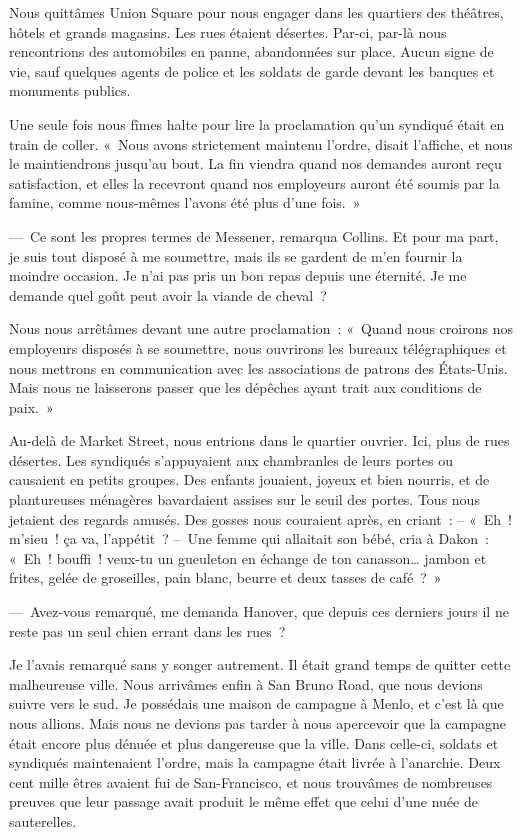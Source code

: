 \documentclass[french,twoside]{book} %
\begin{document}
Nous quittâmes Union Square pour nous engager dans les quartiers des théâtres, hôtels et grands magasins. Les rues étaient désertes. Par-ci, par-là nous rencontrions des automobiles en panne, abandonnées sur place. Aucun signe de vie, sauf quelques agents de police et les soldats de garde devant les banques et monuments publics.\par
Une seule fois nous fîmes halte pour lire la proclamation qu’un syndiqué était en train de coller. « Nous avons strictement maintenu l’ordre, disait l’affiche, et nous le maintiendrons jusqu’au bout. La fin viendra quand nos demandes auront reçu satisfaction, et elles la recevront quand nos employeurs auront été soumis par la famine, comme nous-mêmes l’avons été plus d’une fois. »\par
— Ce sont les propres termes de Messener, remarqua Collins. Et pour ma part, je suis tout disposé à me soumettre, mais ils se gardent de m’en fournir la moindre occasion. Je n’ai pas pris un bon repas depuis une éternité. Je me demande quel goût peut avoir la viande de cheval ?\par
Nous nous arrêtâmes devant une autre proclamation : « Quand nous croirons nos employeurs disposés à se soumettre, nous ouvrirons les bureaux télégraphiques et nous mettrons en communication avec les associations de patrons des États-Unis. Mais nous ne laisserons passer que les dépêches ayant trait aux conditions de paix. »\par
Au-delà de Market Street, nous entrions dans le quartier ouvrier. Ici, plus de rues désertes. Les syndiqués s’appuyaient aux chambranles de leurs portes ou causaient en petits groupes. Des enfants jouaient, joyeux et bien nourris, et de plantureuses ménagères bavardaient assises sur le seuil des portes. Tous nous jetaient des regards amusés. Des gosses nous couraient après, en criant : – « Eh ! m’sieu ! ça va, l’appétit ? – Une femme qui allaitait son bébé, cria à Dakon : « Eh ! bouffi ! veux-tu un gueuleton en échange de ton canasson… jambon et frites, gelée de groseilles, pain blanc, beurre et deux tasses de café ? »\par
— Avez-vous remarqué, me demanda Hanover, que depuis ces derniers jours il ne reste pas un seul chien errant dans les rues ?\par
Je l’avais remarqué sans y songer autrement. Il était grand temps de quitter cette malheureuse ville. Nous arrivâmes enfin à San Bruno Road, que nous devions suivre vers le sud. Je possédais une maison de campagne à Menlo, et c’est là que nous allions. Mais nous ne devions pas tarder à nous apercevoir que la campagne était encore plus dénuée et plus dangereuse que la ville. Dans celle-ci, soldats et syndiqués maintenaient l’ordre, mais la campagne était livrée à l’anarchie. Deux cent mille êtres avaient fui de San-Francisco, et nous trouvâmes de nombreuses preuves que leur passage avait produit le même effet que celui d’une nuée de sauterelles.\par
\end{document}
